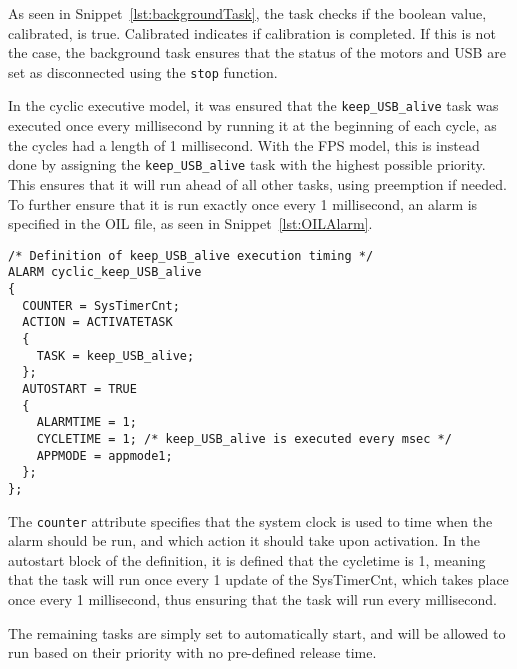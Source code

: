 As seen in Snippet~\ref{lst:backgroundTask}, the task checks if the boolean value, calibrated, is true.
Calibrated indicates if calibration is completed.
If this is not the case, the background task ensures that the status of the motors and USB are set as disconnected using the \texttt{stop} function.

In the cyclic executive model, it was ensured that the \texttt{keep\_USB\_alive} task was executed once every millisecond by running it at the beginning of each cycle, as the cycles had a length of 1 millisecond.
With the FPS model, this is instead done by assigning the \texttt{keep\_USB\_alive} task with the highest possible priority.
This ensures that it will run ahead of all other tasks, using preemption if needed.
To further ensure that it is run exactly once every 1 millisecond, an alarm is specified in the OIL file, as seen in Snippet~\ref{lst:OILAlarm}.

\begin{lstlisting}[language=CSharp,label={lst:OILAlarm},caption={Alarm in the OIL}]
/* Definition of keep_USB_alive execution timing */
ALARM cyclic_keep_USB_alive
{
  COUNTER = SysTimerCnt;
  ACTION = ACTIVATETASK
  {
    TASK = keep_USB_alive;
  };
  AUTOSTART = TRUE
  {
    ALARMTIME = 1;
    CYCLETIME = 1; /* keep_USB_alive is executed every msec */
    APPMODE = appmode1;
  };
};
\end{lstlisting}

The \texttt{counter} attribute specifies that the system clock is used to time when the alarm should be run, and which action it should take upon activation.
In the autostart block of the definition, it is defined that the cycletime is 1, meaning that the task will run once every 1 update of the SysTimerCnt, which takes place once every 1 millisecond, thus ensuring that the task will run every millisecond.

The remaining tasks are simply set to automatically start, and will be allowed to run based on their priority with no pre-defined release time.
